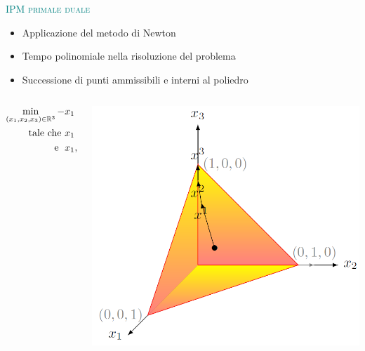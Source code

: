 
\begin{frame}{\textcolor{teal}{\textsc{\LARGE IPM primale duale}}}
	\begin{itemize}
		\pause
		\item Applicazione del metodo di Newton
		\pause
		\item Tempo polinomiale nella risoluzione del problema
		\pause
		\item Successione di punti ammissibili e interni al poliedro
	\end{itemize}
\pause
\begin{columns}
	\begin{column}{0.4\textwidth}
		\begin{align*}
		\min\limits_{(x_{1},x_{2},x_{3})\in\mathbb{R}^{3}} -&x_{1}+ x_{2}-4x_{3}\\
		\text{tale che    }&x_{1}+x_{2}+x_{3}=1,\\
		\text{\; e   \;} &x_{1}, x_{2}, x_{3} \geq 0
		\end{align*}
	\end{column}
	\pause
	\begin{column}{0.4\textwidth}
		\includegraphics[width=\columnwidth]{Feas2.jpg}
	\end{column}
\end{columns}
\end{frame}


